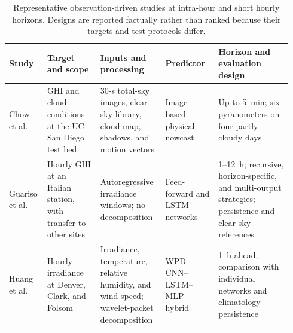 \begin{table}[!t]
\centering
\caption{Representative observation-driven studies at intra-hour and short
hourly horizons. Designs are reported factually rather than ranked because
their targets and test protocols differ.}
\label{tab:literature_review}
\label{tab:literature_review_short}
\scriptsize
\setlength{\tabcolsep}{2.5pt}
\renewcommand{\arraystretch}{1.12}
\begin{tabular}{@{}p{0.11\linewidth}p{0.18\linewidth}p{0.22\linewidth}p{0.18\linewidth}p{0.25\linewidth}@{}}
\toprule
\textbf{Study} & \textbf{Target and scope} & \textbf{Inputs and processing} &
\textbf{Predictor} & \textbf{Horizon and evaluation design} \\
\midrule
Chow et al.\ \cite{chow2011} &
GHI and cloud conditions at the UC San Diego test bed &
30-s total-sky images, clear-sky library, cloud map, shadows, and motion vectors &
Image-based physical nowcast &
Up to 5~min; six pyranometers on four partly cloudy days \\

Guariso et al.\ \cite{guariso2020} &
Hourly GHI at an Italian station, with transfer to other sites &
Autoregressive irradiance windows; no decomposition &
Feed-forward and LSTM networks &
1--12~h; recursive, horizon-specific, and multi-output strategies; persistence and clear-sky references \\

Huang et al.\ \cite{huang2021} &
Hourly irradiance at Denver, Clark, and Folsom &
Irradiance, temperature, relative humidity, and wind speed; wavelet-packet decomposition &
WPD--CNN--LSTM--MLP hybrid &
1~h ahead; comparison with individual networks and climatology--persistence \\
\bottomrule
\end{tabular}
\end{table}


